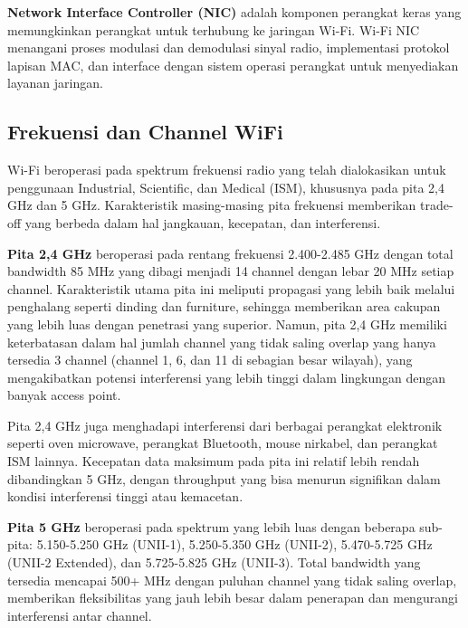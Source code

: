 \textbf{Network Interface Controller (NIC)} adalah komponen perangkat keras yang memungkinkan perangkat untuk terhubung ke jaringan Wi-Fi. Wi-Fi NIC menangani proses modulasi dan demodulasi sinyal radio, implementasi protokol lapisan MAC, dan interface dengan sistem operasi perangkat untuk menyediakan layanan jaringan.

\subsection{Frekuensi dan Channel WiFi}

Wi-Fi beroperasi pada spektrum frekuensi radio yang telah dialokasikan untuk penggunaan Industrial, Scientific, dan Medical (ISM), khususnya pada pita 2,4 GHz dan 5 GHz. Karakteristik masing-masing pita frekuensi memberikan trade-off yang berbeda dalam hal jangkauan, kecepatan, dan interferensi.


\textbf{Pita 2,4 GHz} beroperasi pada rentang frekuensi 2.400-2.485 GHz dengan total bandwidth 85 MHz yang dibagi menjadi 14 channel dengan lebar 20 MHz setiap channel. Karakteristik utama pita ini meliputi propagasi yang lebih baik melalui penghalang seperti dinding dan furniture, sehingga memberikan area cakupan yang lebih luas dengan penetrasi yang superior. Namun, pita 2,4 GHz memiliki keterbatasan dalam hal jumlah channel yang tidak saling overlap yang hanya tersedia 3 channel (channel 1, 6, dan 11 di sebagian besar wilayah), yang mengakibatkan potensi interferensi yang lebih tinggi dalam lingkungan dengan banyak access point.

Pita 2,4 GHz juga menghadapi interferensi dari berbagai perangkat elektronik seperti oven microwave, perangkat Bluetooth, mouse nirkabel, dan perangkat ISM lainnya. Kecepatan data maksimum pada pita ini relatif lebih rendah dibandingkan 5 GHz, dengan throughput yang bisa menurun signifikan dalam kondisi interferensi tinggi atau kemacetan.

\textbf{Pita 5 GHz} beroperasi pada spektrum yang lebih luas dengan beberapa sub-pita: 5.150-5.250 GHz (UNII-1), 5.250-5.350 GHz (UNII-2), 5.470-5.725 GHz (UNII-2 Extended), dan 5.725-5.825 GHz (UNII-3). Total bandwidth yang tersedia mencapai 500+ MHz dengan puluhan channel yang tidak saling overlap, memberikan fleksibilitas yang jauh lebih besar dalam penerapan dan mengurangi interferensi antar channel.

